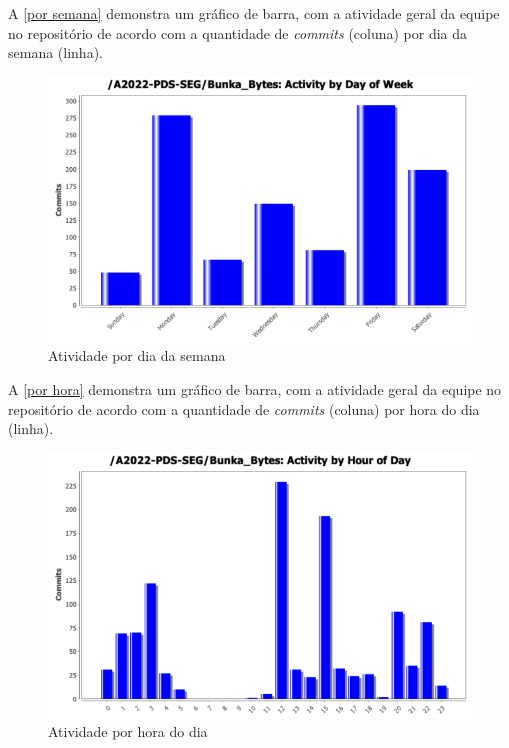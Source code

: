 A \autoref{por semana} demonstra um gráfico de barra, com a atividade geral da equipe no repositório de acordo com a quantidade de \textit{commits} (coluna) por dia da semana (linha).
\begin{figure}[htb]
\centering
\caption{\label{por semana} Atividade por dia da semana}
\includegraphics[width=1.0\textwidth]{anexos/Imagens_Statsvn/dias_da_semana.png}
\end{figure}
\FloatBarrier
A \autoref{por hora} demonstra um gráfico de barra, com a atividade geral da equipe no repositório de acordo com a quantidade de \textit{commits} (coluna) por hora do dia (linha).
\begin{figure}[htb]
\centering
\caption{\label{por hora} Atividade por hora do dia}
\includegraphics[width=1.0\textwidth]{anexos/Imagens_Statsvn/horas_do_dia.png}
\end{figure}
\FloatBarrier